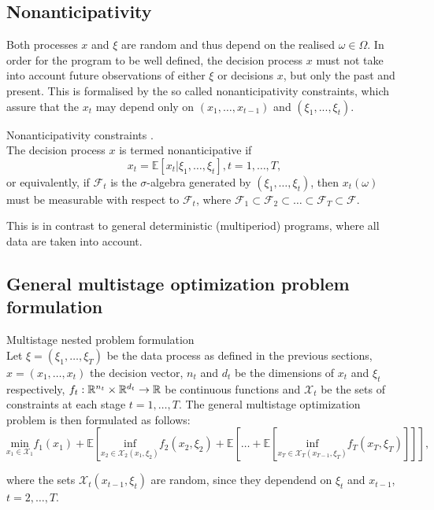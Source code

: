 \subsection{Nonanticipativity}
Both processes $x$ and $\xi$ are random and thus depend on the realised $\omega \in \Omega$. In order for the program to be well defined, the decision process $x$ must not take into account future observations of either 
$\xi$ or decisions $x$, but only the past and present. This is formalised by the so called nonanticipativity constraints, which assure that the $x_t$ may depend only on $(x_1,\dots,x_{t-1})$ and $(\xi_1,...,\xi_{t})$. 

\begin{defn}{Nonanticipativity constraints} \cite[Section 3.3.]{stochasticprogrammingbible}. \\
\label{def:nonanticipativity constraints}
The decision process $x$ is termed nonanticipative if
\begin{equation*}
x_t=\mathbb{E}\left[x_t|\xi_1,\dots,\xi_t \right], t=1,\dots,T,
\end{equation*}
or equivalently, if $\mathcal{F}_t$ is the $\sigma$-algebra generated by $(\xi_1,\dots,\xi_t)$, then $x_t(\omega)$ must be measurable with respect to $\mathcal{F}_t$, where $\mathcal{F}_1 \subset \mathcal{F}_2 \subset \dots \subset \mathcal{F}_T \subset \mathcal{F}$.
\end{defn}
This is in contrast to general deterministic (multiperiod) programs, where all data are taken into account.

\subsection{General multistage optimization problem formulation}
\begin{defn}{Multistage nested problem formulation \cite[Section 3.1.1.]{stochasticprogrammingbible2009}} \\
Let $\xi=(\xi_1,\dots,\xi_{T})$ be the data process as defined in the previous sections, \\ $x=(x_1,\dots,x_t)$ the decision vector, $n_t$ and $d_t$ be the dimensions of $x_t$ and $\xi_t$ respectively, $f_t: \mathbb{R}^{n_t} \times \mathbb{R}^{d_t} \rightarrow \mathbb{R}$ be continuous functions and $
\mathcal{X}_t$ be the sets of constraints at each stage $t=1,\dots,T$. The general multistage optimization problem is then formulated as follows:
\footnotesize
\begin{equation}
\label{eq:generalmultistageprogrammingformulation}
\underset{x_1 \in \mathcal{X}_1}{\mathrm{min}}
 f_1(x_1) + \mathbb{E}\left[ \underset{x_2 \in \mathcal{X}_2(x_1, \xi_2)}{\mathrm{inf}} f_2(x_2,\xi_2) + \mathbb{E}\left[\dots + \mathbb{E}\left[ \underset{x_T \in \mathcal{X}_T(x_{T-1}, \xi_T)}{\mathrm{inf}} f_T(x_T,\xi_T)\right] \right] \right],
\end{equation}

\normalsize
where the sets $\mathcal{X}_t(x_{t-1},\xi_t)$ are random, since they dependend on $\xi_t$ and $x_{t-1}$, $t=2,\dots,T$. 
\end{defn}


